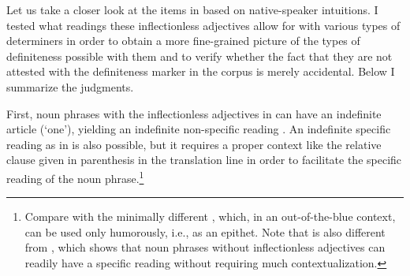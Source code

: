 \documentclass[output=paper]{langscibook}
\begin{document}
\noindent Let us take a closer look at the items in  based on native-speaker intuitions. I tested what readings these inflectionless adjectives allow for with various types of determiners in order to obtain a more fine-grained picture of the types of definiteness possible with them and to verify whether the fact that they are not attested with the definiteness marker in the corpus is merely accidental. Below I summarize the judgments.\largerpage

First, noun phrases with the inflectionless adjectives in  can have an indefinite article (`one'), yielding an indefinite non-specific reading . An indefinite specific reading as in  is also possible, but it requires a proper context like the relative clause given in parenthesis in the translation line in order to facilitate the specific reading of the noun phrase.\footnote{Compare  with the minimally different , which, in an out-of-the-blue context, can be used only humorously, i.e., as an epithet. Note that  is also different from , which shows that noun phrases without inflectionless adjectives can readily have a specific reading without requiring much contextualization.

\ea{}
\z
\z

}
\z
\end{document}

